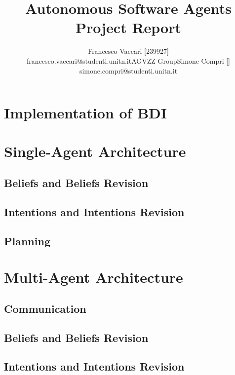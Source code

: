 \documentclass[a4paper, 11pt]{article}
\title{\Huge{Autonomous Software Agents} \\ \Large{Project Report} }
\author{
\begin{tabular}{ccc}
\parbox{6cm}{\centering Francesco Vaccari [239927] \\ \small{\centering francesco.vaccari@studenti.unitn.it}} & 
\parbox{2cm}{\centering \footnotesize{AGVZZ Group}} & 
\parbox{6cm}{\centering Simone Compri [] \\ \small{\centering simone.compri@studenti.unitn.it}}
\end{tabular}
}
\date{}
\begin{document}
\maketitle
\tableofcontents




\section{Implementation of BDI}


\pagebreak



\section{Single-Agent Architecture}


\subsection{Beliefs and Beliefs Revision}


\subsection{Intentions and Intentions Revision}


\subsection{Planning}





\pagebreak

\section{Multi-Agent Architecture}


\subsection{Communication}


\subsection{Beliefs and Beliefs Revision}


\subsection{Intentions and Intentions Revision}
\end{document}
